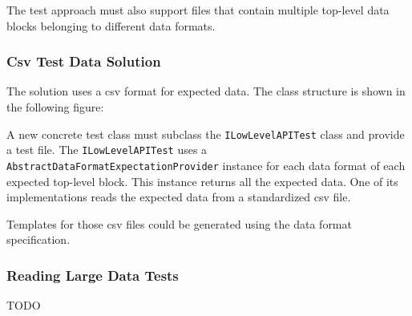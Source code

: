 The test approach must also support files that contain multiple top-level data blocks belonging to different data formats.


\subsubsection{Csv Test Data Solution}
\label{sec:CsvTestDataSolution}

The solution uses a csv format for expected data. The class structure is shown in the following figure:


A new concrete test class must subclass the \texttt{ILowLevelAPITest} class and provide a test file. The \texttt{ILowLevelAPITest} uses a \texttt{AbstractDataFormatExpectationProvider} instance for each data format of each expected top-level block. This instance returns all the expected data. One of its implementations reads the expected data from a standardized csv file.

Templates for those csv files could be generated using the data format specification. 


\subsubsection{Reading Large Data Tests}
\label{sec:ReadingLargeDataTests}

TODO

%
%
